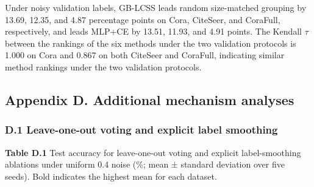 Under noisy validation labels, GB-LCSS leads random size-matched grouping by 13.69, 12.35, and 4.87 percentage points on Cora, CiteSeer, and CoraFull, respectively, and leads MLP+CE by 13.51, 11.93, and 4.91 points. The Kendall \(\tau\) between the rankings of the six methods under the two validation protocols is 1.000 on Cora and 0.867 on both CiteSeer and CoraFull, indicating similar method rankings under the two validation protocols.

\subsection{Appendix D. Additional mechanism analyses}\label{appendix-d.-additional-mechanism-analyses}

\subsubsection{D.1 Leave-one-out voting and explicit label smoothing}\label{d.1-leave-one-out-voting-and-explicit-label-smoothing}

\textbf{Table D.1} Test accuracy for leave-one-out voting and explicit label-smoothing ablations under uniform 0.4 noise (\%; mean ± standard deviation over five seeds). Bold indicates the highest mean for each dataset.

